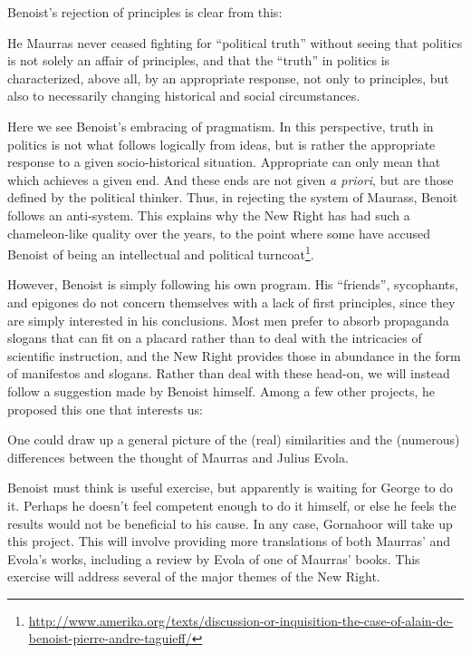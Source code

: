 Benoist's rejection of principles is clear from this:

\begin{quotex}
He Maurras never ceased fighting for ``political truth'' without seeing that politics is not solely an affair of principles, and that the ``truth'' in politics is characterized, above all, by an appropriate response, not only to principles, but also to necessarily changing historical and social circumstances.
\end{quotex}


Here we see Benoist's embracing of pragmatism. In this perspective, truth in politics is not what follows logically from ideas, but is rather the appropriate response to a given socio-historical situation. Appropriate can only mean that which achieves a given end. And these ends are not given \emph{a priori}, but are those defined by the political thinker. Thus, in rejecting the system of Maurass, Benoit follows an anti-system. This explains why the New Right has had such a chameleon-like quality over the years, to the point where some have accused Benoist of being an intellectual and political turncoat\footnote{\url{http://www.amerika.org/texts/discussion-or-inquisition-the-case-of-alain-de-benoist-pierre-andre-taguieff/}}.

However, Benoist is simply following his own program. His ``friends'', sycophants, and epigones do not concern themselves with a lack of first principles, since they are simply interested in his conclusions. Most men prefer to absorb propaganda slogans that can fit on a placard rather than to deal with the intricacies of scientific instruction, and the New Right provides those in abundance in the form of manifestos and slogans. Rather than deal with these head-on, we will instead follow a suggestion made by Benoist himself. Among a few other projects, he proposed this one that interests us:

\begin{quotex}
One could draw up a general picture of the (real) similarities and the (numerous) differences between the thought of Maurras and Julius Evola.
\end{quotex}


Benoist must think is useful exercise, but apparently is waiting for George to do it. Perhaps he doesn't feel competent enough to do it himself, or else he feels the results would not be beneficial to his cause. In any case, Gornahoor will take up this project. This will involve providing more translations of both Maurras' and Evola's works, including a review by Evola of one of Maurras' books. This exercise will address several of the major themes of the New Right.


